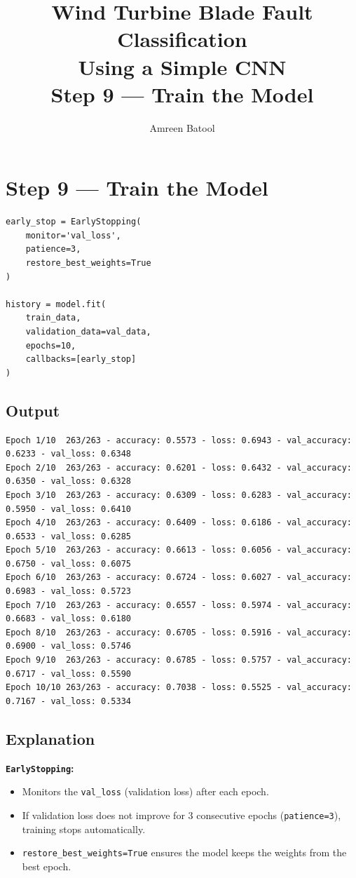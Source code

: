 \documentclass[12pt]{article}
\title{\textbf{Wind Turbine Blade Fault Classification\\Using a Simple CNN}\\[0.5em]
\large Step 9 --- Train the Model}
\author{Amreen Batool}
\date{}
\begin{document}
\maketitle

\section*{Step 9 --- Train the Model}

\begin{lstlisting}[style=pythonstyle]
early_stop = EarlyStopping(
    monitor='val_loss',
    patience=3,
    restore_best_weights=True
)

history = model.fit(
    train_data,
    validation_data=val_data,
    epochs=10,
    callbacks=[early_stop]
)
\end{lstlisting}

\subsection*{Output}

\begin{lstlisting}[style=outputstyle]
Epoch 1/10  263/263 - accuracy: 0.5573 - loss: 0.6943 - val_accuracy: 0.6233 - val_loss: 0.6348
Epoch 2/10  263/263 - accuracy: 0.6201 - loss: 0.6432 - val_accuracy: 0.6350 - val_loss: 0.6328
Epoch 3/10  263/263 - accuracy: 0.6309 - loss: 0.6283 - val_accuracy: 0.5950 - val_loss: 0.6410
Epoch 4/10  263/263 - accuracy: 0.6409 - loss: 0.6186 - val_accuracy: 0.6533 - val_loss: 0.6285
Epoch 5/10  263/263 - accuracy: 0.6613 - loss: 0.6056 - val_accuracy: 0.6750 - val_loss: 0.6075
Epoch 6/10  263/263 - accuracy: 0.6724 - loss: 0.6027 - val_accuracy: 0.6983 - val_loss: 0.5723
Epoch 7/10  263/263 - accuracy: 0.6557 - loss: 0.5974 - val_accuracy: 0.6683 - val_loss: 0.6180
Epoch 8/10  263/263 - accuracy: 0.6705 - loss: 0.5916 - val_accuracy: 0.6900 - val_loss: 0.5746
Epoch 9/10  263/263 - accuracy: 0.6785 - loss: 0.5757 - val_accuracy: 0.6717 - val_loss: 0.5590
Epoch 10/10 263/263 - accuracy: 0.7038 - loss: 0.5525 - val_accuracy: 0.7167 - val_loss: 0.5334
\end{lstlisting}

\subsection*{Explanation}

\textbf{\texttt{EarlyStopping}:}
\begin{itemize}
    \item Monitors the \texttt{val\_loss} (validation loss) after each epoch.
    \item If validation loss does not improve for 3 consecutive epochs (\texttt{patience=3}), training stops automatically.
    \item \texttt{restore\_best\_weights=True} ensures the model keeps the weights from the best epoch.
\end{itemize}
\end{document}
